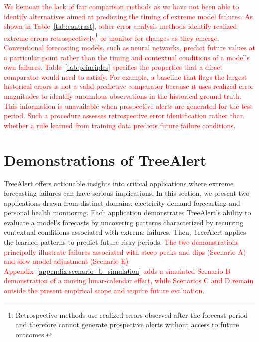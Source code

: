 \documentclass[12pt]{article}
\newcommand{\matt}[1]{\textcolor{red}{#1}}
\begin{document}
\matt{We bemoan the lack of fair comparison methods as we have not been able to identify alternatives aimed at predicting the timing of extreme model failures.  As shown in Table~\ref{tab:contrast}, other error analysis methods identify realized extreme errors retrospectively\footnote{Retrospective methods use realized errors observed after the forecast period and therefore cannot generate prospective alerts without access to future outcomes.} or monitor for changes as they emerge. Conventional forecasting models, such as neural networks, predict future values at a particular point rather than the timing and contextual conditions of a model's own failures. Table~\ref{tab:principles} specifies the properties that a direct comparator would need to satisfy. For example, a baseline that flags the largest historical errors is not a valid predictive comparator because it uses realized error magnitudes to identify anomalous observations in the historical ground truth. This information is unavailable when prospective alerts are generated for the test period. Such a procedure assesses retrospective error identification rather than whether a rule learned from training data predicts future failure conditions.}

\section{Demonstrations of TreeAlert}
\label{sec-demo}

TreeAlert offers actionable insights into critical applications where extreme forecasting failures can have serious implications. In this section, we present two applications drawn from distinct domains: electricity demand forecasting and personal health monitoring. 
Each application demonstrates TreeAlert's ability  to evaluate a model's forecasts by uncovering patterns characterized by recurring contextual conditions associated with extreme failures. Then, TreeAlert applies the learned patterns to predict future risky periods. \matt{The two demonstrations principally illustrate failures associated with steep peaks and dips (Scenario A) and slow model adjustment (Scenario E); Appendix~\ref{appendix:scenario_b_simulation} adds a simulated Scenario B demonstration of a moving lunar-calendar effect, while Scenarios C and D remain outside the present empirical scope and require future evaluation.}%
\end{document}
